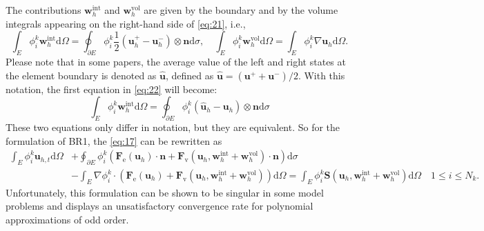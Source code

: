 \documentclass{develop-note}
\begin{document}
The contributions $\mathbf{w}_{h}^{\mathrm{int}}$ and $\mathbf{w}_{h}^{\mathrm{vol}}$ are given by the boundary and by the volume integrals appearing on the right-hand side of \autoref{eq:21}, i.e.,
\begin{equation}
  \label{eq:22}
  \int_{E}\phi_{i}^{k}\mathbf{w}_{h}^{\mathrm{int}}\mathrm{d}\Omega=\oint_{\partial E}\phi_{i}^{k}\dfrac{1}{2}(\mathbf{u}_{h}^{+}-\mathbf{u}_{h}^{-})\otimes\mathbf{n}\mathrm{d}\sigma,\quad \int_{E}\phi_{i}^{k}\mathbf{w}_{h}^{\mathrm{vol}}\mathrm{d}\Omega=\int_{E}\phi_{i}^{k}\nabla\mathbf{u}_{h}\mathrm{d}\Omega.
\end{equation}
Please note that in some papers, the average value of the left and right states at the element boundary is denoted as $\hat{\mathbf{u}}$, defined as $\hat{\mathbf{u}}=(\mathbf{u}^{+}+\mathbf{u}^{-})/2$. With this notation, the first equation in \autoref{eq:22} will become:
\begin{equation}
  \int_{E}\phi_{i}^{k}\mathbf{w}_{h}^{\mathrm{int}}\mathrm{d}\Omega=\oint_{\partial E}\phi_{i}^{k}(\hat{\mathbf{u}}_{h}-\mathbf{u}_{h})\otimes\mathbf{n}\mathrm{d}\sigma
\end{equation}
These two equations only differ in notation, but they are equivalent. So for the formulation of BR1, the \autoref{eq:17} can be rewritten as
\begin{equation}
  \label{eq:24}
  \begin{aligned}
    \int_{E}\phi_{i}^{k}\mathbf{u}_{h,t}\mathrm{d}\Omega &+\oint_{\partial E}\phi_{i}^{k}(\mathbf{F}_{\mathrm{e}}(\mathbf{u}_{h})\cdot\mathbf{n}+\mathbf{F}_{\mathrm{v}}(\mathbf{u}_{h},\mathbf{w}_{h}^{\mathrm{int}}+\mathbf{w}_{h}^{\mathrm{vol}})\cdot\mathbf{n})\mathrm{d}\sigma\\
    &-\int_{E}\nabla\phi_{i}^{k}\cdot(\mathbf{F}_{\mathrm{e}}(\mathbf{u}_{h})+\mathbf{F}_{\mathrm{v}}(\mathbf{u}_{h},\mathbf{w}_{h}^{\mathrm{int}}+\mathbf{w}_{h}^{\mathrm{vol}}))\mathrm{d}\Omega=\int_{E}\phi_{i}^{k}\mathbf{S}(\mathbf{u}_{h},\mathbf{w}_{h}^{\mathrm{int}}+\mathbf{w}_{h}^{\mathrm{vol}})\mathrm{d}\Omega\quad 1\leqslant i\leqslant N_{k}.
  \end{aligned}
\end{equation}
Unfortunately, this formulation can be shown to be singular in some model problems and displays an unsatisfactory convergence rate for polynomial approximations of odd order.
\end{document}
